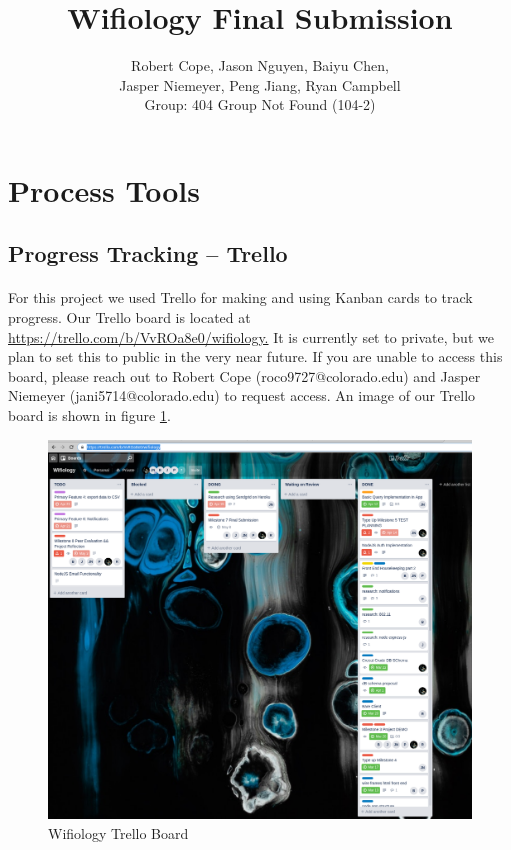 \documentclass[]{article}
\begin{document}
	\title{Wifiology Final Submission}
	\author{
	Robert Cope, Jason Nguyen, Baiyu Chen,  \\
	Jasper Niemeyer, Peng Jiang, Ryan Campbell\\
	Group: 404 Group Not Found (104-2)}
	\maketitle

	\section{Process Tools}
	\subsection{Progress Tracking -- Trello}
	\paragraph{} For this project we used Trello for making and using Kanban cards to track progress. Our Trello board is located 
	at \href{https://trello.com/b/VvROa8e0/wifiology}{https://trello.com/b/VvROa8e0/wifiology.} It is currently set to private, but
	we plan to set this to public in the very near future. If you are unable to access this board, please reach out to Robert Cope
	(roco9727@colorado.edu) and Jasper Niemeyer (jani5714@colorado.edu) to request access. An image of our Trello board is shown in
	figure \ref{fig:trello_board}.
		
	\begin{figure}[h]
	\label{fig:trello_board}
	\includegraphics[width=1.0\textwidth]{trello}
	\caption{Wifiology Trello Board}
	\end{figure}
\end{document}
